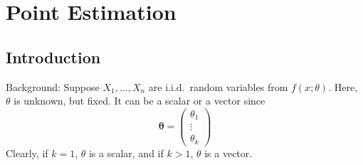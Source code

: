 \chapter{Point Estimation}
\section{Introduction}
Background: Suppose $ X_1,\ldots,X_n $
are i.i.d.\ random variables from
$ f(x;\theta) $. Here, $ \theta $ is unknown, but fixed.
It can be a scalar
or a vector since
\[ \symbf{\theta}=\begin{pmatrix}
        \theta_1 \\
        \vdots   \\
        \theta_k
    \end{pmatrix} \]
Clearly, if $ k=1 $, $ \theta $ is a scalar,
and if $ k>1 $, $ \theta $ is a vector.

